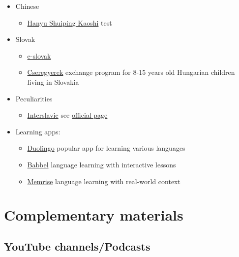 \documentclass{article}
\begin{document}
\begin{itemize}
    \item Chinese
    \begin{itemize}
        \item \href{https://en.wikipedia.org/wiki/Hanyu_Shuiping_Kaoshi}{Hanyu Shuiping Kaoshi} test
    \end{itemize}
    \item Slovak
    \begin{itemize}
        \item \href{https://www.e-slovak.sk/}{e-slovak}
        \item \href{https://www.cseregyerek.sk/}{Cseregyerek} exchange program for 8-15 years old Hungarian children living in Slovakia 
    \end{itemize}
    \item Peculiarities
    \begin{itemize}
        \item \href{https://en.wikipedia.org/wiki/Interslavic}{Interslavic} see \href{http://interslavic-language.org/}{official page}
    \end{itemize}
    \item Learning apps:
    \begin{itemize}
        \item \href{https://www.duolingo.com/}{Duolingo} popular app for learning various languages
        \item \href{https://www.babbel.com/}{Babbel} language learning with interactive lessons
        \item \href{https://www.memrise.com/}{Memrise} language learning with real-world context
    \end{itemize}
\end{itemize}

\section{Complementary materials}

\subsection{YouTube channels/Podcasts}
\end{document}

